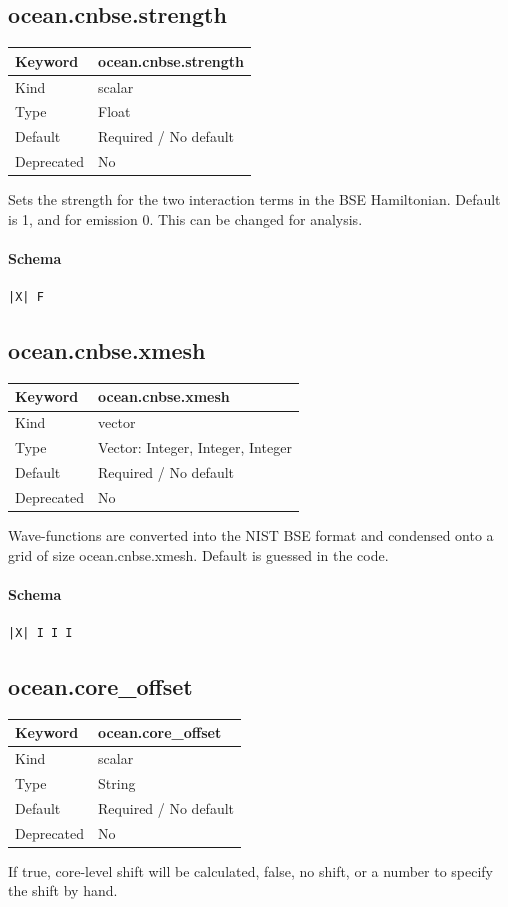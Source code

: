 \documentclass[11pt]{article}
\begin{document}
{{{{{\subsection{ocean.cnbse.strength}
\label{kw:ocean-cnbse-strength}
\begin{longtable}{|p{1.5in}|p{4.5in}|}
\hline
Keyword & ocean.cnbse.strength \\
\hline
Kind & scalar \\
\hline
Type & Float \\
\hline
Default & Required / No default \\
\hline
Deprecated & No \\
\hline
\end{longtable}
 Sets the strength for the two interaction terms in the BSE Hamiltonian.
 Default is 1, and for emission 0. This can be changed for analysis.

\paragraph{Schema}
\begin{Verbatim}
|X| F
\end{Verbatim}

\subsection{ocean.cnbse.xmesh}
\label{kw:ocean-cnbse-xmesh}
\begin{longtable}{|p{1.5in}|p{4.5in}|}
\hline
Keyword & ocean.cnbse.xmesh \\
\hline
Kind & vector \\
\hline
Type & Vector: Integer, Integer, Integer \\
\hline
Default & Required / No default \\
\hline
Deprecated & No \\
\hline
\end{longtable}
 Wave-functions are converted into the NIST BSE format and condensed onto a
 grid of size ocean.cnbse.xmesh. Default is guessed in the code.

\paragraph{Schema}
\begin{Verbatim}
|X| I I I
\end{Verbatim}

\subsection{ocean.core\_offset}
\label{kw:ocean-core-offset}
\begin{longtable}{|p{1.5in}|p{4.5in}|}
\hline
Keyword & ocean.core\_offset \\
\hline
Kind & scalar \\
\hline
Type & String \\
\hline
Default & Required / No default \\
\hline
Deprecated & No \\
\hline
\end{longtable}
 If true, core-level shift will be calculated, false, no shift, or a number
 to specify the shift by hand.

}}}}}
\end{document}
